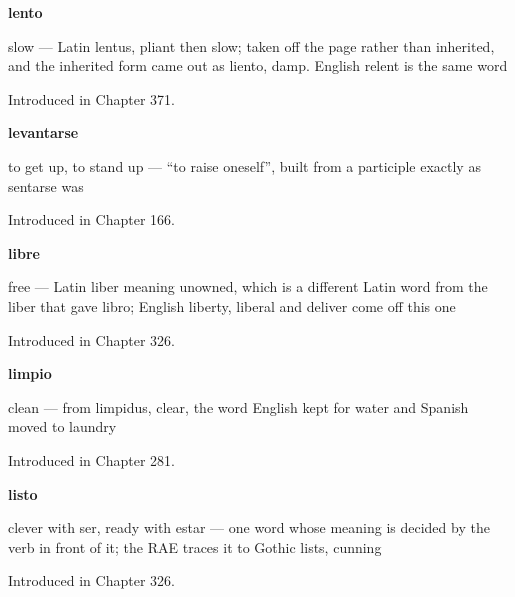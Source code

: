 \noindent\begin{minipage}[t]{\linewidth}
\raggedright
\textbf{lento}\par
\small slow — Latin lentus, pliant then slow; taken off the page rather than inherited, and the inherited form came out as liento, damp. English relent is the same word\par
\footnotesize Introduced in Chapter 371.
\end{minipage}\par\medskip

\noindent\begin{minipage}[t]{\linewidth}
\raggedright
\textbf{levantarse}\par
\small to get up, to stand up — \textquotedblleft{}to raise oneself\textquotedblright{}, built from a participle exactly as sentarse was\par
\footnotesize Introduced in Chapter 166.
\end{minipage}\par\medskip

\noindent\begin{minipage}[t]{\linewidth}
\raggedright
\textbf{libre}\par
\small free — Latin liber meaning unowned, which is a different Latin word from the liber that gave libro; English liberty, liberal and deliver come off this one\par
\footnotesize Introduced in Chapter 326.
\end{minipage}\par\medskip

\noindent\begin{minipage}[t]{\linewidth}
\raggedright
\textbf{limpio}\par
\small clean — from limpidus, clear, the word English kept for water and Spanish moved to laundry\par
\footnotesize Introduced in Chapter 281.
\end{minipage}\par\medskip

\noindent\begin{minipage}[t]{\linewidth}
\raggedright
\textbf{listo}\par
\small clever with ser, ready with estar — one word whose meaning is decided by the verb in front of it; the RAE traces it to Gothic lists, cunning\par
\footnotesize Introduced in Chapter 326.
\end{minipage}\par\medskip

